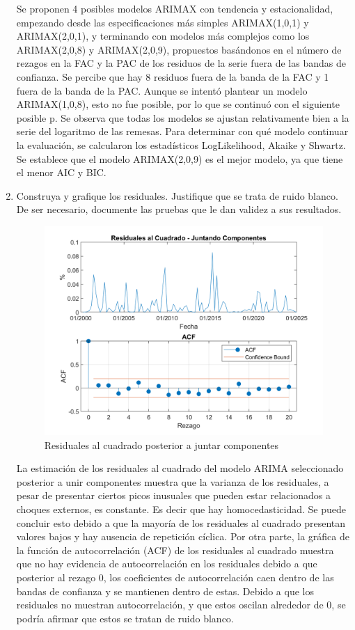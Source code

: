 \documentclass{article}
\theoremstyle{remark}
\theoremstyle{definition}
\begin{document}
\begin{enumerate}[label=\emph{\alph*})]
Se proponen 4 posibles modelos ARIMAX con tendencia y estacionalidad, empezando desde las especificaciones más simples ARIMAX(1,0,1) y ARIMAX(2,0,1), y terminando con modelos más complejos como los ARIMAX(2,0,8) y ARIMAX(2,0,9), propuestos basándonos en el número de rezagos en la FAC y la PAC de los residuos de la serie fuera de las bandas de confianza. Se percibe que hay 8 residuos fuera de la banda de la FAC y 1 fuera de la banda de la PAC. Aunque se intentó plantear un modelo ARIMAX(1,0,8), esto no fue posible, por lo que se continuó con el siguiente posible p. Se observa que todas los modelos se ajustan relativamente bien a la serie del logaritmo de las remesas. Para determinar con qué modelo continuar la evaluación, se calcularon los estadísticos LogLikelihood, Akaike y Shwartz. Se establece que el modelo ARIMAX(2,0,9) es el mejor modelo, ya que tiene el menor AIC y BIC. 
 
        
    \item {Construya y grafique los residuales. Justifique que se trata de ruido blanco. De ser necesario, documente las pruebas que le dan validez a sus resultados.}
        \begin{tcolorbox}[title=Soluci\'on 3.f]
            \begin{figure}[H]
                \centering
                \includegraphics[width=0.5\linewidth]{docs/ARIMA_2_0_9_residuales.png}
                \caption{Residuales al cuadrado posterior a juntar componentes}
                \label{fig:enter-label}
            \end{figure}
            La estimación de los residuales al cuadrado del modelo ARIMA seleccionado posterior a unir componentes muestra que la varianza de los residuales, a pesar de presentar ciertos picos inusuales que pueden estar relacionados a choques externos, es constante. Es decir que hay homocedasticidad. Se puede concluir esto debido a que la mayoría de los residuales al cuadrado presentan valores bajos y hay ausencia de repetición cíclica. Por otra parte, la gráfica de la función de autocorrelación (ACF) de los residuales al cuadrado muestra que no hay evidencia de autocorrelación en los residuales debido a que posterior al rezago 0, los coeficientes de autocorrelación caen dentro de las bandas de confianza y se mantienen dentro de estas. Debido a que los residuales no muestran autocorrelación, y que estos oscilan alrededor de 0, se podría afirmar que estos se tratan de ruido blanco. 
            

\end{tcolorbox}
\end{enumerate}
\end{document}
